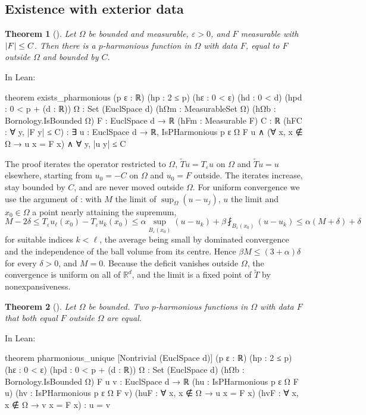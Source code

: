 \documentclass[11pt,reqno]{amsart}
\newcommand{\R}{\mathbb{R}}
\newcommand{\eps}{\varepsilon}
\newcommand{\Op}{T_{\eps}}                       %
\DeclarePairedDelimiter{\abs}{\lvert}{\rvert}
\theoremstyle{plain}
\newtheorem{theorem}{Theorem}[section]
\theoremstyle{definition}
\theoremstyle{remark}
\begin{document}
\subsection{Existence with exterior data}\label{ssec:existence}
\begin{theorem}[]\label{thm:exist}
Let $\Omega$ be bounded and measurable, $\eps > 0$, and $F$ measurable with
$\abs F \le C$. Then there is a $p$-harmonious function in $\Omega$ with data
$F$, equal to $F$ outside $\Omega$ and bounded by $C$.
\end{theorem}

\noindent In Lean:
\begin{lean}
theorem exists_pharmonious (p ε : ℝ) (hp : 2 ≤ p) (hε : 0 < ε) (hd : 0 < d)
    (hpd : 0 < p + (d : ℝ)) {Ω : Set (EuclSpace d)} (hΩm : MeasurableSet Ω)
    (hΩb : Bornology.IsBounded Ω)
    {F : EuclSpace d → ℝ} (hFm : Measurable F) {C : ℝ}
    (hFC : ∀ y, |F y| ≤ C) :
    ∃ u : EuclSpace d → ℝ, IsPHarmonious p ε Ω F u
      ∧ (∀ x, x ∉ Ω → u x = F x) ∧ ∀ y, |u y| ≤ C
\end{lean}

The proof iterates the operator restricted to $\Omega$, $\widetilde T u = \Op u$
on $\Omega$ and $\widetilde T u = u$ elsewhere, starting from $u_0 = -C$ on
$\Omega$ and $u_0 = F$ outside. The iterates increase, stay bounded by $C$, and
are never moved outside $\Omega$. For uniform convergence we use the argument of
\cite{LPS14}: with $M$ the limit of $\sup_{\Omega}(u - u_j)$, $u$ the limit and
$x_0 \in \Omega$ a point nearly attaining the supremum,
\[
  M - 2\delta \le \Op u_\ell(x_0) - \Op u_k(x_0)
  \le \alpha \sup_{B_\eps(x_0)}(u - u_k) + \beta \fint_{B_\eps(x_0)}(u - u_k)
  \le \alpha(M + \delta) + \delta
\]
for suitable indices $k < \ell$, the average being small by dominated
convergence and the independence of the ball volume from its centre. Hence
$\beta M \le (3 + \alpha)\delta$ for every $\delta > 0$, and $M = 0$. Because the
deficit vanishes outside $\Omega$, the convergence is uniform on all of $\R^d$,
and the limit is a fixed point of $\widetilde T$ by nonexpansiveness.

\begin{theorem}[]\label{thm:discunique}
Let $\Omega$ be bounded. Two $p$-harmonious functions in $\Omega$ with data $F$
that both equal $F$ outside $\Omega$ are equal.
\end{theorem}

\noindent In Lean:
\begin{lean}
theorem pharmonious_unique [Nontrivial (EuclSpace d)] (p ε : ℝ) (hp : 2 ≤ p)
    (hε : 0 < ε) (hpd : 0 < p + (d : ℝ)) {Ω : Set (EuclSpace d)}
    (hΩb : Bornology.IsBounded Ω) {F u v : EuclSpace d → ℝ}
    (hu : IsPHarmonious p ε Ω F u) (hv : IsPHarmonious p ε Ω F v)
    (huF : ∀ x, x ∉ Ω → u x = F x) (hvF : ∀ x, x ∉ Ω → v x = F x) :
    u = v
\end{lean}
\end{document}
